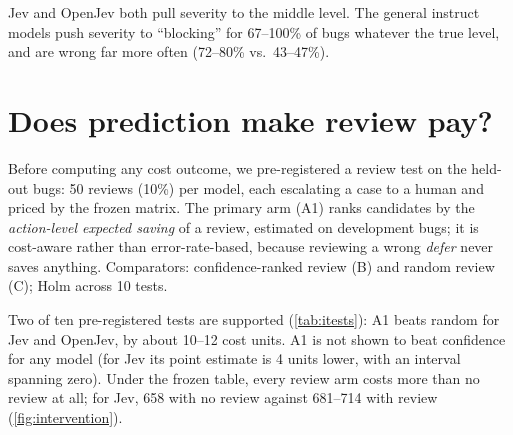  Jev and OpenJev both pull
severity to the middle level. The general instruct models push severity
to ``blocking'' for 67--100\% of bugs whatever the true level, and are
wrong far more often (72--80\% vs.\ 43--47\%).

\section{Does prediction make review pay?}
\label{sec:intervention}

 Before computing any cost outcome, we pre-registered a
review test on the held-out bugs: 50 reviews (10\%) per model, each
escalating a case to a human and priced by the frozen matrix. The primary
arm (A1) ranks candidates by the \emph{action-level expected saving} of a
review, estimated on development bugs; it is cost-aware rather than
error-rate-based, because reviewing a wrong \emph{defer} never saves
anything. Comparators: confidence-ranked review (B) and random review (C);
Holm across 10 tests.

\begin{table}[t]
\centering
\small
\resizebox{\linewidth}{!}{}
\caption{Pre-registered intervention tests: difference in total cost
(A1 minus comparator; negative favors A1) at a 10\% budget, with 95\%
bootstrap intervals. $^{*}$Supported after Holm correction across all
10 tests.}
\label{tab:itests}
\end{table}

 Two of ten pre-registered tests are supported (\cref{tab:itests}): A1 beats
random for Jev and OpenJev, by about 10--12 cost units. A1 is not shown to
beat confidence for any model (for Jev its point estimate is 4 units
lower, with an interval spanning zero). Under the frozen table, every
review arm costs more than no review at all; for Jev, 658 with no review against 681--714 with review
(\cref{fig:intervention}).

\begin{table}[t]
\centering
\small
\resizebox{\linewidth}{!}{}
\caption{Exploratory cost sensitivity: best feasible arm minus no review
(negative, in bold: review pays), with rankings frozen as pre-registered.
$m$ scales wrong-accept costs, $h$ is the human cost per escalation, and
$p^{*}$ is the break-even precision for reviewing an accepted case whose
target is \emph{escalate}. $^{\dagger}$The pre-registered table. Point
estimates only.}
\label{tab:costsens}
\end{table}

